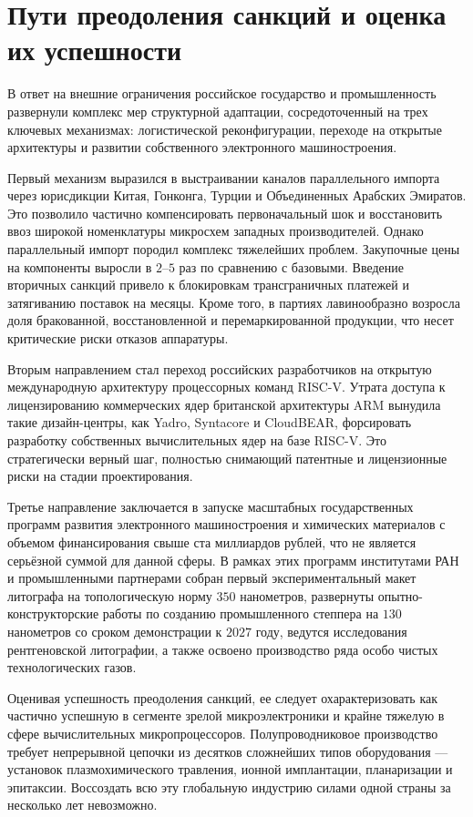 \documentclass[12pt,a4paper]{article}
\begin{document}
\section{Пути преодоления санкций и оценка их успешности}

В ответ на внешние ограничения российское государство и промышленность 
развернули комплекс мер структурной адаптации, сосредоточенный на 
трех ключевых механизмах: логистической реконфигурации, переходе на 
открытые архитектуры и развитии собственного электронного машиностроения.

Первый механизм выразился в выстраивании каналов параллельного импорта 
через юрисдикции Китая, Гонконга, Турции и Объединенных Арабских 
Эмиратов. Это позволило частично компенсировать первоначальный шок и 
восстановить ввоз широкой номенклатуры микросхем западных 
производителей. Однако параллельный импорт породил комплекс 
тяжелейших проблем. Закупочные цены на компоненты выросли в $2$--$5$ раз 
по сравнению с базовыми. Введение вторичных санкций привело к 
блокировкам трансграничных платежей и затягиванию поставок на месяцы. 
Кроме того, в партиях лавинообразно возросла доля бракованной, 
восстановленной и перемаркированной продукции, что несет критические 
риски отказов аппаратуры.

Вторым направлением стал переход российских разработчиков на открытую 
международную архитектуру процессорных команд RISC-V. Утрата доступа к 
лицензированию коммерческих ядер британской архитектуры ARM вынудила 
такие дизайн-центры, как Yadro, Syntacore и CloudBEAR, форсировать 
разработку собственных вычислительных ядер на базе RISC-V. Это 
стратегически верный шаг, полностью снимающий патентные и лицензионные 
риски на стадии проектирования.

Третье направление заключается в запуске масштабных государственных 
программ развития электронного машиностроения и химических материалов 
с объемом финансирования свыше ста миллиардов рублей, что не является 
серьёзной суммой для данной сферы. В рамках этих 
программ институтами РАН и промышленными партнерами собран первый 
экспериментальный макет литографа на топологическую норму $350$ 
нанометров, развернуты опытно-конструкторские работы по созданию 
промышленного степпера на $130$ нанометров со сроком демонстрации к 
$2027$ году, ведутся исследования рентгеновской литографии, а также 
освоено производство ряда особо чистых технологических газов.

Оценивая успешность преодоления санкций, ее следует охарактеризовать 
как частично успешную в сегменте зрелой микроэлектроники и крайне 
тяжелую в сфере вычислительных микропроцессоров. Полупроводниковое 
производство требует непрерывной цепочки из десятков сложнейших 
типов оборудования --- установок плазмохимического травления, ионной 
имплантации, планаризации и эпитаксии. Воссоздать всю эту глобальную 
индустрию силами одной страны за несколько лет невозможно.
\end{document}
